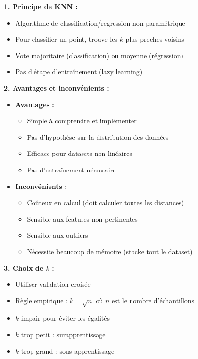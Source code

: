 \documentclass[11pt,a4paper]{article}
\begin{document}
\begin{solutionbox}
\textbf{1. Principe de KNN :}
\begin{itemize}
    \item Algorithme de classification/regression non-paramétrique
    \item Pour classifier un point, trouve les $k$ plus proches voisins
    \item Vote majoritaire (classification) ou moyenne (régression)
    \item Pas d'étape d'entraînement (lazy learning)
\end{itemize}

\textbf{2. Avantages et inconvénients :}
\begin{itemize}
    \item \textbf{Avantages :}
    \begin{itemize}
        \item Simple à comprendre et implémenter
        \item Pas d'hypothèse sur la distribution des données
        \item Efficace pour datasets non-linéaires
        \item Pas d'entraînement nécessaire
    \end{itemize}
    \item \textbf{Inconvénients :}
    \begin{itemize}
        \item Coûteux en calcul (doit calculer toutes les distances)
        \item Sensible aux features non pertinentes
        \item Sensible aux outliers
        \item Nécessite beaucoup de mémoire (stocke tout le dataset)
    \end{itemize}
\end{itemize}

\textbf{3. Choix de $k$ :}
\begin{itemize}
    \item Utiliser validation croisée
    \item Règle empirique : $k = \sqrt{n}$ où $n$ est le nombre d'échantillons
    \item $k$ impair pour éviter les égalités
    \item $k$ trop petit : surapprentissage
    \item $k$ trop grand : sous-apprentissage
\end{itemize}


\end{solutionbox}
\end{document}
